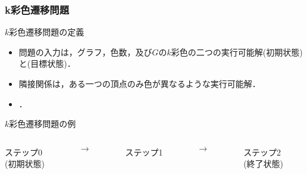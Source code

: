 \documentclass[dvipdfmx,11pt]{beamer}
\begin{document}
\begin{frame}\frametitle{k彩色遷移問題}

  \begin{block}{$k$彩色遷移問題の定義}
    \begin{itemize}
      \item 問題の入力は，グラフ，色数，及び$G$の$k$彩色の二つの実行可能解\structure{$\alpha$}(初期状態)と\structure{$\beta$}(目標状態)．
      \item 隣接関係は，ある一つの頂点のみ色が異なるような実行可能解．
      \item {}．
    \end{itemize}
  \end{block}

  \begin{exampleblock}{$k$彩色遷移問題の例}
    \begin{columns}
      \begin{column}{0.3\textwidth}
        \centering
        
        ステップ0\\(初期状態)
      \end{column}
      \begin{column}{0.05\textwidth}
        \textbf{$\longrightarrow$}
      \end{column}
      \begin{column}[]{0.3\textwidth}
        \centering
        
        ステップ1
      \end{column}
      \begin{column}{0.05\textwidth}
        \textbf{$\longrightarrow$}
      \end{column}
      \begin{column}{0.3\textwidth}
        \centering
        
        ステップ2\\(終了状態)
      \end{column}
    \end{columns}
  \end{exampleblock}
  
\end{frame}

\end{document}
